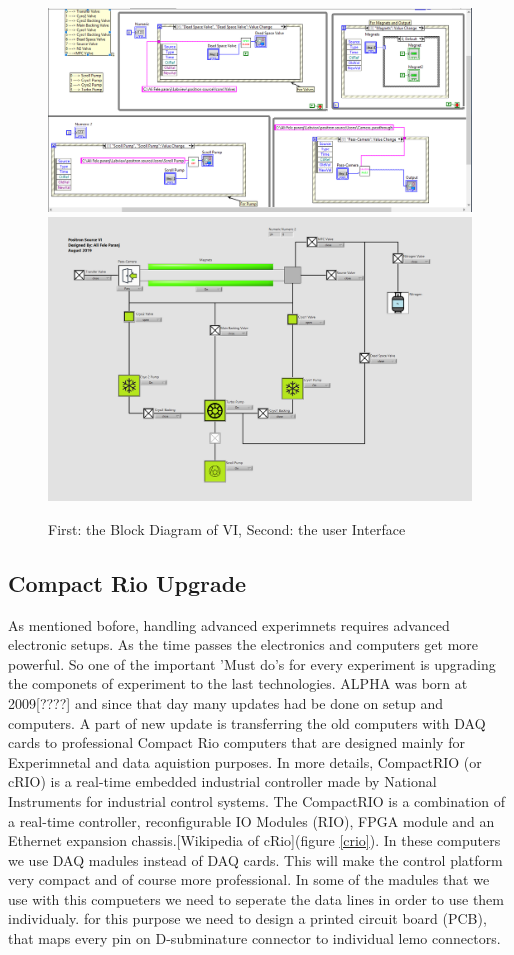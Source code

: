 \documentclass[12pt,a4paper]{article}
\begin{document}
\begin{figure}[h]
\centering
\includegraphics[scale=0.29]{Block-Diagram}
\includegraphics[scale=0.22]{InterFace}
\caption{First: the Block Diagram of VI, Second: the user Interface}
\end{figure}

\subsection{Compact Rio Upgrade}
As mentioned bofore, handling advanced experimnets requires advanced electronic setups. As the  time passes the electronics and computers get more powerful. So one of the important 'Must do's for every experiment is upgrading the componets of experiment to the last technologies. ALPHA was born at 2009[????] and since that day many updates had be done on setup and computers. A part of new update is transferring the old computers with DAQ cards to professional Compact Rio computers that are designed mainly for Experimnetal and data aquistion purposes. In more details, CompactRIO (or cRIO) is a real-time embedded industrial controller made by National Instruments for industrial control systems. The CompactRIO is a combination of a real-time controller, reconfigurable IO Modules (RIO), FPGA module and an Ethernet expansion chassis.[Wikipedia of cRio](figure \ref{crio}). In these computers we use DAQ madules instead of DAQ cards. This will make the control platform very compact and of course more professional. In some of the madules that we use with this compueters we need to seperate the data lines in order to use them individualy. for this purpose we need to design a printed circuit board (PCB), that maps every pin on D-subminature connector to individual lemo connectors.
\end{document}
